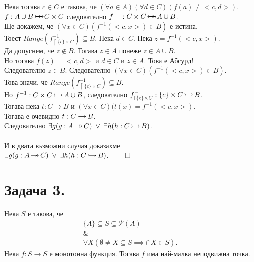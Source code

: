 \documentclass[12pt]{article}
\newcommand{\injection}[0]{\,\mathlarger{\mathlarger{\rightarrowtail}}\,}
\newcommand{\surjection}[0]{\,\mathlarger{\mathlarger{\twoheadrightarrow}}\,}
\newcommand{\bijection}[0]{\mathbin{\mathlarger{\mathlarger{\rightarrowtail}} \hspace{-14pt} \mathlarger{\mathlarger{\twoheadrightarrow}}}}
\begin{document}
Нека тогава \(c \in C\) е такова, че
\((\forall a \in A)(\forall d \in C)(f(a) \neq <c, d>)\).
\\
\(f : A \cup B \bijection C \times C\) следователно \(f^{-1} : C \times C \bijection  A \cup B\).
\\
Ще докажем, че \((\forall x \in C)(f^{-1}(<c, x>) \in B)\) е истина.
\\
Тоест \(Range(f^{-1}_{\restriction \{c\} \times C}) \subseteq B\).
Нека \(d \in C\). Нека \(z = f^{-1}(<c, x>)\).
\\
Да допуснем, че \(z \notin B\).
Тогава \(z \in A\) понеже \(z \in A \cup B\).
\\
Но тогава \(f(z) = <c, d>\) и \(d \in C\) и \(z \in A\).
Това е Абсурд!
\\
Следователно \(z \in B\).
Следователно \((\forall x \in C)(f^{-1}(<c, x>) \in B)\).
\\
Това значи, че \(Range(f^{-1}_{\restriction \{c\} \times C}) \subseteq B\).
\\
Но \(f^{-1} : C \times C \injection  A \cup B\), следователно \(f^{-1}_{\restriction \{c\} \times C} : \{c\} \times C \injection B\).
\\
Тогава нека \(t : C \to B\) и \((\forall x \in C)(t(x) = f^{-1}(<c, x>)\).
\\
Тогава е очевидно \(t : C \injection B\).
\\
Следователно \(\exists g (g : A \surjection C) \; \lor \; \exists h (h : C \injection B)\). 
\\
\vspace{1mm}
\\
И в двата възможни случая доказахме
\\
\(\exists g (g : A \surjection C) \; \lor \; \exists h (h : C \injection B)\). \(\qed\)

\section*{Задача 3.}
Нека \(S\) е такова, че
\begin{align*}
    \{A\} \subseteq S \subseteq \mathcal{P}(A) \\
    \& \\
    \forall X(\emptyset \neq X \subseteq S \implies \cap X \in S).
\end{align*}
Нека \(f : S \to S\) е монотонна функция.
Тогава \(f\) има най-малка неподвижна точка.
\end{document}
